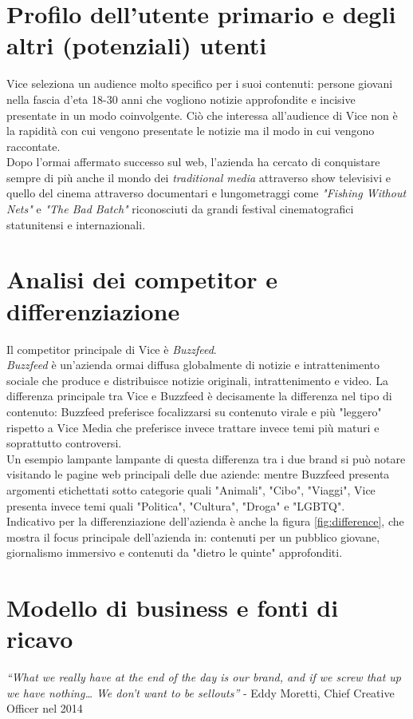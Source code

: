 \documentclass[a4paper, 11pt]{article}
\begin{document}
\section*{Profilo dell’utente primario e degli altri (potenziali) utenti}
\par Vice seleziona un audience molto specifico per i suoi contenuti: persone giovani nella fascia d'eta 18-30 anni che vogliono notizie approfondite e incisive presentate in un modo coinvolgente.
Ciò che interessa all'audience di Vice non è la rapidità con cui vengono presentate le notizie ma il modo in cui vengono raccontate.\\
Dopo l'ormai affermato successo sul web, l'azienda ha cercato di conquistare sempre di più anche il mondo dei \textit{traditional media} attraverso show televisivi e quello del cinema attraverso documentari e lungometraggi come \textit{"Fishing Without Nets"} e\textit{ "The Bad Batch"} riconosciuti da grandi festival cinematografici statunitensi e internazionali.

\newpage
\section*{Analisi dei competitor e differenziazione}
\par Il competitor principale di Vice è \textit{Buzzfeed}.\\ 
\textit{Buzzfeed} è un'azienda ormai diffusa globalmente di notizie e intrattenimento sociale che produce e distribuisce notizie originali, intrattenimento e video.
La differenza principale tra Vice e Buzzfeed è decisamente la differenza nel tipo di contenuto: Buzzfeed preferisce focalizzarsi su contenuto virale e più "leggero" rispetto a Vice Media che preferisce invece trattare invece temi più maturi e soprattutto controversi.\\
Un esempio lampante lampante di questa differenza tra i due brand si può notare visitando le pagine web principali delle due aziende: mentre Buzzfeed presenta argomenti etichettati sotto categorie quali "Animali", "Cibo", "Viaggi", Vice presenta invece temi quali "Politica", "Cultura", "Droga" e "LGBTQ".\\
Indicativo per la differenziazione dell'azienda è anche la figura \ref{fig:difference}, che mostra il focus principale dell'azienda in: contenuti per un pubblico giovane, giornalismo immersivo e contenuti da "dietro le quinte" approfonditi. 


\section*{Modello di business e fonti di ricavo}
\textit{“What we really have at the end of the day is our brand, and if we screw that up we have nothing… We don’t want to be sellouts”} - Eddy Moretti, Chief Creative Officer nel 2014\\
\end{document}
